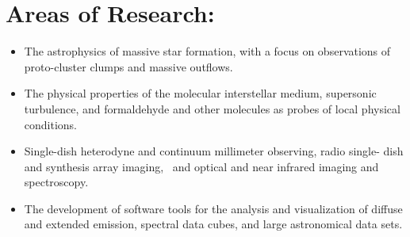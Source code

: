 \section*{Areas of Research: }
\begin{itemize}
    \item The astrophysics of massive star formation, with a focus on
        observations of proto-cluster clumps and massive outflows.
    \item The physical properties of the molecular interstellar medium,
        supersonic turbulence, and formaldehyde and other molecules as probes
        of local physical conditions. 
    \item Single-dish heterodyne and continuum millimeter observing, radio
        single- dish and synthesis array  imaging,  and optical and near
        infrared imaging and spectroscopy. 
    \item The development of software tools for the analysis and visualization
        of diffuse and extended emission, spectral data cubes, and large
        astronomical data sets.
\end{itemize}

